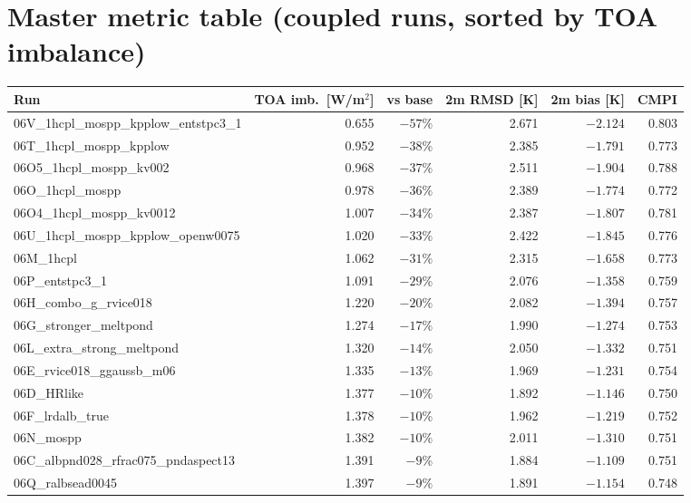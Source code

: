 \documentclass[10pt]{article}
\begin{document}
\section{Master metric table (coupled runs, sorted by TOA imbalance)}
\begin{center}\small
\begin{tabular}{l r r r r r}
\toprule
Run & TOA imb.\ [W/m$^2$] & vs base & 2m RMSD [K] & 2m bias [K] & CMPI \\
\midrule
06V\_1hcpl\_mospp\_kpplow\_entstpc3\_1 & 0.655 & $-57\%$ & 2.671 & $-2.124$ & 0.803 \\
06T\_1hcpl\_mospp\_kpplow             & 0.952 & $-38\%$ & 2.385 & $-1.791$ & 0.773 \\
06O5\_1hcpl\_mospp\_kv002             & 0.968 & $-37\%$ & 2.511 & $-1.904$ & 0.788 \\
06O\_1hcpl\_mospp                     & 0.978 & $-36\%$ & 2.389 & $-1.774$ & 0.772 \\
06O4\_1hcpl\_mospp\_kv0012            & 1.007 & $-34\%$ & 2.387 & $-1.807$ & 0.781 \\
06U\_1hcpl\_mospp\_kpplow\_openw0075  & 1.020 & $-33\%$ & 2.422 & $-1.845$ & 0.776 \\
06M\_1hcpl                            & 1.062 & $-31\%$ & 2.315 & $-1.658$ & 0.773 \\
06P\_entstpc3\_1                      & 1.091 & $-29\%$ & 2.076 & $-1.358$ & 0.759 \\
06H\_combo\_g\_rvice018               & 1.220 & $-20\%$ & 2.082 & $-1.394$ & 0.757 \\
06G\_stronger\_meltpond               & 1.274 & $-17\%$ & 1.990 & $-1.274$ & 0.753 \\
06L\_extra\_strong\_meltpond          & 1.320 & $-14\%$ & 2.050 & $-1.332$ & 0.751 \\
06E\_rvice018\_ggaussb\_m06           & 1.335 & $-13\%$ & 1.969 & $-1.231$ & 0.754 \\
06D\_HRlike                           & 1.377 & $-10\%$ & 1.892 & $-1.146$ & 0.750 \\
06F\_lrdalb\_true                     & 1.378 & $-10\%$ & 1.962 & $-1.219$ & 0.752 \\
06N\_mospp                            & 1.382 & $-10\%$ & 2.011 & $-1.310$ & 0.751 \\
06C\_albpnd028\_rfrac075\_pndaspect13 & 1.391 & $-9\%$  & 1.884 & $-1.109$ & 0.751 \\
06Q\_ralbsead0045                     & 1.397 & $-9\%$  & 1.891 & $-1.154$ & 0.748 \\

\end{tabular}
\end{center}
\end{document}
